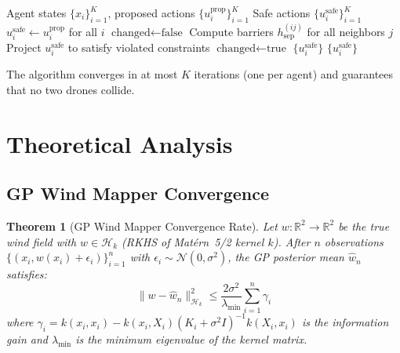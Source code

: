 \documentclass[11pt,twocolumn]{article}
\newtheorem{theorem}{Theorem}[section]
\theoremstyle{definition}
\newcommand{\R}{\mathbb{R}}
\newcommand{\N}{\mathcal{N}}
\newcommand{\cH}{\mathcal{H}}
\begin{document}
\begin{algorithm}[t]
\caption{Distributed Consensus Safety Verification}
\label{alg:consensus}
\begin{algorithmic}[1]
\REQUIRE Agent states $\{x_i\}_{i=1}^K$, proposed actions $\{u_i^{\text{prop}}\}_{i=1}^K$
\ENSURE Safe actions $\{u_i^{\text{safe}}\}_{i=1}^K$
\STATE $u_i^{\text{safe}} \leftarrow u_i^{\text{prop}}$ for all $i$
    \STATE $\text{changed} \leftarrow \text{false}$
        \STATE Compute barriers $h_{\text{sep}}^{(ij)}$ for all neighbors $j$
            \STATE Project $u_i^{\text{safe}}$ to satisfy violated constraints
            \STATE $\text{changed} \leftarrow \text{true}$
        \ENDIF
    \ENDFOR
        \RETURN $\{u_i^{\text{safe}}\}$
    \ENDIF
\ENDFOR
\RETURN $\{u_i^{\text{safe}}\}$
\end{algorithmic}
\end{algorithm}

The algorithm converges in at most $K$ iterations (one per agent) and guarantees that no two drones collide.

\section{Theoretical Analysis}
\label{sec:theory}

\subsection{GP Wind Mapper Convergence}

\begin{theorem}[GP Wind Mapper Convergence Rate]
\label{thm:gp_convergence}
Let $w: \R^2 \to \R^2$ be the true wind field with $w \in \cH_k$ (RKHS of Mat\'ern~5/2 kernel $k$). After $n$ observations $\{(x_i, w(x_i) + \epsilon_i)\}_{i=1}^n$ with $\epsilon_i \sim \N(0, \sigma^2)$, the GP posterior mean $\hat{w}_n$ satisfies:
\begin{equation}
\|w - \hat{w}_n\|_{\cH_k}^2 \leq \frac{2\sigma^2}{\lambda_{\min}} \sum_{i=1}^n \gamma_i
\end{equation}
where $\gamma_i = k(x_i, x_i) - k(x_i, X_i)(K_i + \sigma^2 I)^{-1}k(X_i, x_i)$ is the information gain and $\lambda_{\min}$ is the minimum eigenvalue of the kernel matrix.
\end{theorem}
\end{document}
